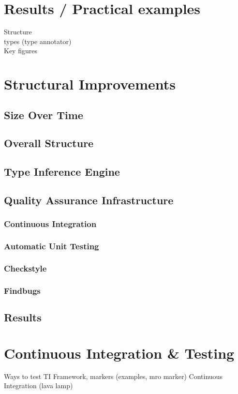 \documentclass[12pt,halfparskip,DIV11,BCOR10mm]{scrreprt}
\begin{document}
\chapter{Results / Practical examples}

Structure \\
types (type annotator)\\
Key figures



\chapter{Structural Improvements}
\section{Size Over Time}
\section{Overall Structure}
\section{Type Inference Engine}
\section{Quality Assurance Infrastructure}
\subsection{Continuous Integration}
\subsection{Automatic Unit Testing}
\subsection{Checkstyle}
\subsection{Findbugs}
\section{Results}

\chapter{Continuous Integration \& Testing}
 Ways to test TI
 Framework, markers
  (examples, mro marker)
 Continuous Integration
  (lava lamp)
\end{document}
